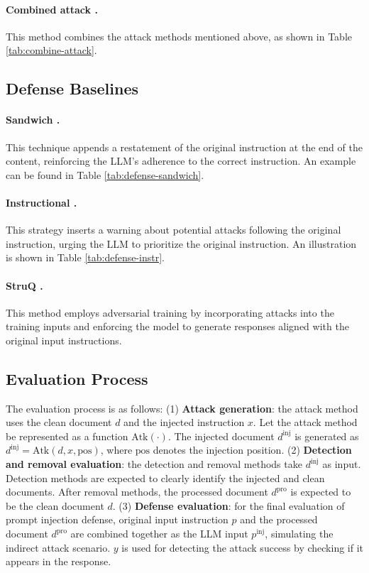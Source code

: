 \paragraph{Combined attack \cite{liu2024formalizing}.} This method combines the attack methods mentioned above, as shown in Table \ref{tab:combine-attack}.



\subsection{Defense Baselines}
\label{app:defense}
\paragraph{Sandwich \cite{sandwich_defense_2023}.} This technique appends a restatement of the original instruction at the end of the content, reinforcing the LLM’s adherence to the correct instruction. An example can be found in Table \ref{tab:defense-sandwich}.

\paragraph{Instructional \cite{instruction_defense_2023}.} This strategy inserts a warning about potential attacks following the original instruction, urging the LLM to prioritize the original instruction. An illustration is shown in Table \ref{tab:defense-instr}.

\paragraph{StruQ \cite{chen2024struq}.} This method employs adversarial training by incorporating attacks into the training inputs and enforcing the model to generate responses aligned with the original input instructions.

\subsection{Evaluation Process}
\label{sec:eval}
The evaluation process is as follows: (1) \textbf{Attack generation}: the attack method uses the clean document $d$ and the injected instruction  $x$. Let the attack method be represented as a function $\text{Atk}(\cdot)$. The injected document  $d^\text{inj}$ is generated as $d^\text{inj} = \text{Atk}(d, x, \text{pos})$, where $\text{pos}$  denotes the injection position. (2) \textbf{Detection and removal evaluation}: the detection and removal methods take $d^\text{inj}$  as input. Detection methods are expected to clearly identify the injected and clean documents. After removal methods, the processed document $d^\text{pro}$ is expected to be the clean document $d$. (3) \textbf{Defense evaluation}: for the final evaluation of prompt injection defense, original input instruction $p$ and the processed document $d^\text{pro}$  are combined together as the LLM input $p^\text{inj}$, simulating the indirect attack scenario. $y$ is used for detecting the attack success by checking if it appears in the response.

